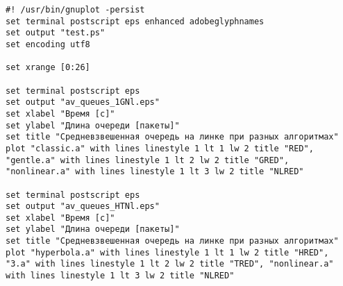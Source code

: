 \begin{verbatim}
#! /usr/bin/gnuplot -persist
set terminal postscript eps enhanced adobeglyphnames
set output "test.ps"
set encoding utf8

set xrange [0:26]

set terminal postscript eps
set output "av_queues_1GNl.eps"
set xlabel "Время [c]"
set ylabel "Длина очереди [пакеты]"
set title "Средневзвешенная очередь на линке при разных алгоритмах"
plot "classic.a" with lines linestyle 1 lt 1 lw 2 title "RED", "gentle.a" with lines linestyle 1 lt 2 lw 2 title "GRED", "nonlinear.a" with lines linestyle 1 lt 3 lw 2 title "NLRED" 

set terminal postscript eps
set output "av_queues_HTNl.eps"
set xlabel "Время [c]"
set ylabel "Длина очереди [пакеты]"
set title "Средневзвешенная очередь на линке при разных алгоритмах"
plot "hyperbola.a" with lines linestyle 1 lt 1 lw 2 title "HRED", "3.a" with lines linestyle 1 lt 2 lw 2 title "TRED", "nonlinear.a" with lines linestyle 1 lt 3 lw 2 title "NLRED" 
\end{verbatim}











